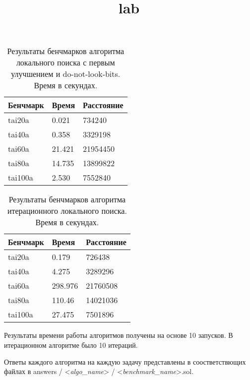 \documentclass{article}
\title{lab}
\author{}
\date{}
\begin{document}
\setlength{\parindent}{35pt}
\setlength{\footnotemargin}{5pt}
\sloppy
\frenchspacing %



\begin{table}[!h]
    \begin{center}
        \begin{tabular}{ | m{4.2em} | m{5em} | m{5em} |}
            \hline
            Бенчмарк & Время  & Расстояние \\
            \hline
            tai20a   & 0.021  & 734240     \\
            \hline
            tai40a   & 0.358  & 3329198    \\
            \hline
            tai60a   & 21.421 & 21954450   \\
            \hline
            tai80a   & 14.735 & 13899822   \\
            \hline
            tai100a  & 2.530  & 7552840    \\
            \hline
        \end{tabular}
        \caption{Результаты бенчмарков алгоритма локального поиска с первым улучшением
            и do-not-look-bits. Время в секундах.}
    \end{center}
\end{table}

\begin{table}[!h]
    \begin{center}
        \begin{tabular}{ | m{4.2em} | m{5em} | m{5em} |}
            \hline
            Бенчмарк & Время   & Расстояние \\
            \hline
            tai20a   & 0.179   & 726438     \\
            \hline
            tai40a   & 4.275   & 3289296    \\
            \hline
            tai60a   & 298.976 & 21760508   \\
            \hline
            tai80a   & 110.46  & 14021036   \\
            \hline
            tai100a  & 27.475  & 7501896    \\
            \hline
        \end{tabular}
        \caption{Результаты бенчмарков алгоритма итерационного локального поиска. Время в секундах.}
    \end{center}
\end{table}

Результаты времени работы алгоритмов получены на основе 10 запусков.
В итерационном алгоритме было 10 итераций.

Ответы каждого алгоритма на каждую задачу представлены в соостветствющих файлах в
answers / <\textit{algo\_name}> / <\textit{benchmark\_name}>.sol.
\end{document}
